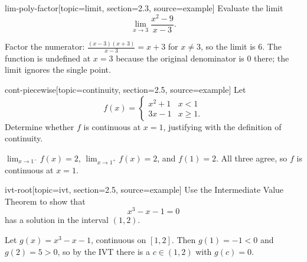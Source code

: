 %

\begin{problem}{lim-poly-factor}[topic=limit, section=2.3, source=example]
	Evaluate the limit
	\[ \lim_{x \to 3} \frac{x^2 - 9}{x - 3}. \]
	\begin{solution}
	Factor the numerator: $\frac{(x-3)(x+3)}{x-3} = x + 3$ for $x \neq 3$,
	so the limit is $6$. The function is undefined at $x = 3$ because the
	original denominator is $0$ there; the limit ignores the single point.
	\end{solution}
\end{problem}

\begin{problem}{cont-piecewise}[topic=continuity, section=2.5, source=example]
	Let
	\[ f(x) = \begin{cases} x^2 + 1 & x < 1 \\ 3x - 1 & x \ge 1. \end{cases} \]
	Determine whether $f$ is continuous at $x = 1$, justifying with the
	definition of continuity.
	\begin{solution}
	$\lim_{x \to 1^-} f(x) = 2$, $\lim_{x \to 1^+} f(x) = 2$, and
	$f(1) = 2$. All three agree, so $f$ is continuous at $x = 1$.
	\end{solution}
\end{problem}

\begin{problem}{ivt-root}[topic=ivt, section=2.5, source=example]
	Use the Intermediate Value Theorem to show that
	\[ x^3 - x - 1 = 0 \]
	has a solution in the interval $(1, 2)$.
	\begin{solution}
	Let $g(x) = x^3 - x - 1$, continuous on $[1,2]$. Then $g(1) = -1 < 0$
	and $g(2) = 5 > 0$, so by the IVT there is a $c \in (1,2)$ with
	$g(c) = 0$.
	\end{solution}
\end{problem}
